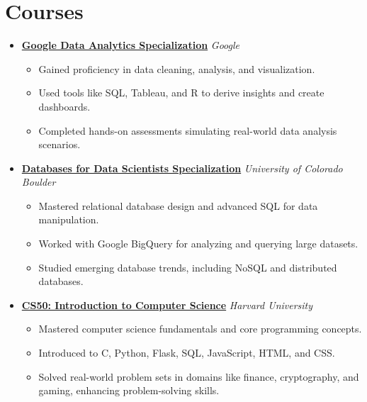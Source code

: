 \documentclass[letterpaper,11pt]{article}
\begin{document}
\section*{Courses}
\begin{itemize}[leftmargin=0.15in]
  \item \textbf{\href{https://www.coursera.org/account/accomplishments/specialization/AS9JOBALFZSL}{Google Data Analytics Specialization}} \hfill \textit{Google}\\
  \begin{itemize}[leftmargin=0.2in]
    \item Gained proficiency in data cleaning, analysis, and visualization.
    \item Used tools like SQL, Tableau, and R to derive insights and create dashboards.
    \item Completed hands-on assessments simulating real-world data analysis scenarios.
  \end{itemize}

  \item \textbf{\href{https://www.coursera.org/account/accomplishments/specialization/GIPG5MXXA0FZ}{Databases for Data Scientists Specialization}} \hfill \textit{University of Colorado Boulder}\\
  \begin{itemize}[leftmargin=0.2in]
    \item Mastered relational database design and advanced SQL for data manipulation.
    \item Worked with Google BigQuery for analyzing and querying large datasets.
    \item Studied emerging database trends, including NoSQL and distributed databases.
  \end{itemize}

  \item \textbf{\href{https://certificates.cs50.io/fe4b0a5a-c586-4a15-91ec-6b8a65f829e4.pdf?size=letter}{CS50: Introduction to Computer Science}} \hfill \textit{Harvard University}\\
  \begin{itemize}[leftmargin=0.2in]
    \item Mastered computer science fundamentals and core programming concepts.
    \item Introduced to C, Python, Flask, SQL, JavaScript, HTML, and CSS.
    \item Solved real-world problem sets in domains like finance, cryptography, and gaming, enhancing problem-solving skills.
  \end{itemize}
\end{itemize}
\end{document}
